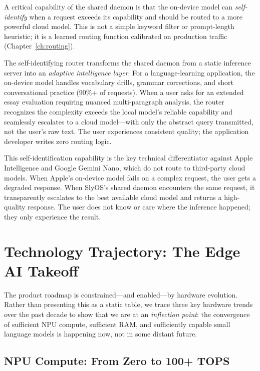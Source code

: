 \documentclass[12pt, letterpaper, twoside]{report}
\begin{document}
A critical capability of the shared daemon is that the on-device model can \textit{self-identify} when a request exceeds its capability and should be routed to a more powerful cloud model. This is not a simple keyword filter or prompt-length heuristic; it is a learned routing function calibrated on production traffic (Chapter~\ref{ch:routing}).

The self-identifying router transforms the shared daemon from a static inference server into an \textit{adaptive intelligence layer}. For a language-learning application, the on-device model handles vocabulary drills, grammar corrections, and short conversational practice (90\%+ of requests). When a user asks for an extended essay evaluation requiring nuanced multi-paragraph analysis, the router recognizes the complexity exceeds the local model's reliable capability and seamlessly escalates to a cloud model---with only the abstract query transmitted, not the user's raw text. The user experiences consistent quality; the application developer writes zero routing logic.

This self-identification capability is the key technical differentiator against Apple Intelligence and Google Gemini Nano, which do not route to third-party cloud models. When Apple's on-device model fails on a complex request, the user gets a degraded response. When SlyOS's shared daemon encounters the same request, it transparently escalates to the best available cloud model and returns a high-quality response. The user does not know or care where the inference happened; they only experience the result.

\section{Technology Trajectory: The Edge AI Takeoff}
\label{sec:tech_trajectory}

The product roadmap is constrained---and enabled---by hardware evolution. Rather than presenting this as a static table, we trace three key hardware trends over the past decade to show that we are at an \textit{inflection point}: the convergence of sufficient NPU compute, sufficient RAM, and sufficiently capable small language models is happening now, not in some distant future.

\subsection{NPU Compute: From Zero to 100+ TOPS}
\end{document}
